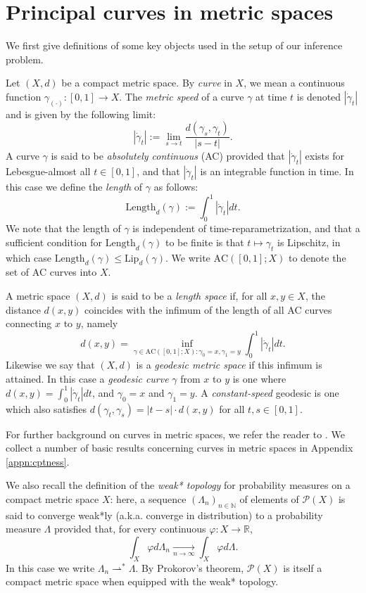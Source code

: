 \documentclass[aos, preprint]{imsart}
\theoremstyle{plain}
\theoremstyle{remark}
\begin{document}
\section{Principal curves in metric spaces}
\label{sec:basics}

We first give definitions of some key objects used in the setup of our inference problem.

Let $(X,d)$ be a compact metric space. By \emph{curve} in $X$, we
mean a continuous function $\gamma_{(\cdot)}:[0,1]\rightarrow X$.
The \emph{metric speed} of a curve $\gamma$ at time $t$ is denoted
$|\dot{\gamma}_{t}|$ and is given by the following limit:
\[
|\dot{\gamma}_{t}|:=\lim_{s\rightarrow t}\frac{d(\gamma_{s},\gamma_{t})}{|s-t|}.
\]
A curve $\gamma$ is said to be \emph{absolutely continuous} (AC)
provided that $|\dot{\gamma}_{t}|$ exists for Lebesgue-almost all
$t\in[0,1]$, and that $|\dot{\gamma}_{t}|$ is an integrable function in time. In this case we define the \emph{length} of $\gamma$
as follows:
\[
\text{Length}_{d}(\gamma):=\int_{0}^{1}|\dot{\gamma}_{t}|dt.
\]
We note that the length of $\gamma$ is independent of time-reparametrization,
and that a sufficient condition for $\text{Length}_{d}(\gamma)$ to
be finite is that $t\mapsto\gamma_{t}$ is Lipschitz, in which case
$\text{Length}_{d}(\gamma)\leq\text{Lip}_{d}(\gamma)$. We write $\text{AC}([0,1];X)$
to denote the set of AC curves into $X$.

A metric space $(X,d)$ is said to be a \emph{length space }if, for
all $x,y\in X$, the distance $d(x,y)$ coincides with the infimum
of the length of all AC curves connecting $x$ to $y$, namely
\[
d(x,y)=\inf_{\gamma\in\text{AC}([0,1];X):\gamma_{0}=x,\gamma_{1}=y}\int_{0}^{1}|\dot{\gamma}_{t}|dt.
\]
Likewise we say that $(X,d)$ is a \emph{geodesic metric space} if
this infimum is attained. In this case a \emph{geodesic curve} $\gamma$
from $x$ to $y$ is one where $d(x,y)=\int_{0}^{1}|\dot{\gamma}_t|dt$,
and $\gamma_{0}=x$ and $\gamma_{1}=y$. A \emph{constant-speed} geodesic is one which also satisfies $d(\gamma_t,\gamma_s)=|t-s|\cdot d(x,y)$ for all $t,s\in[0,1]$.

For further background on curves in metric spaces, we refer the reader to \cite{ambrosio2004topics, burago2001course}. We collect a number of basic results concerning curves in metric spaces in Appendix \ref{appn:cptness}.

We also recall the definition of the \emph{weak* topology} for probability measures on a compact metric space $X$: here, a sequence $(\Lambda_n)_{n\in \mathbb{N}}$ of elements of $\mathcal{P}(X)$ is said to converge weak*ly (a.k.a. converge in distribution) to a probability measure $\Lambda$ provided that, for every continuous $\varphi : X \rightarrow \mathbb{R}$, $$\int_X \varphi d\Lambda_n \underset{n\rightarrow\infty}{\longrightarrow} \int_X \varphi d\Lambda.$$ In this case we write $\Lambda_n \rightharpoonup^* \Lambda$. By Prokorov's theorem, $\mathcal{P}(X)$ is itself a compact metric space when equipped with the weak* topology.
\end{document}
